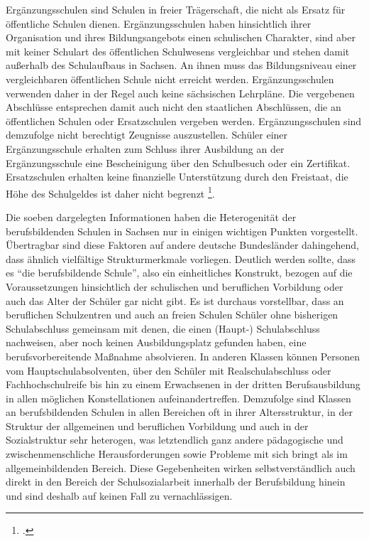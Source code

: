 Ergänzungsschulen sind Schulen in freier Trägerschaft, die nicht als Ersatz für öffentliche Schulen dienen. Ergänzungsschulen haben hinsichtlich ihrer Organisation und ihres Bildungsangebots einen schulischen Charakter, sind aber mit keiner Schulart des öffentlichen Schulwesens vergleichbar und stehen damit außerhalb des Schulaufbaus in Sachsen. An ihnen muss das Bildungsniveau einer vergleichbaren öffentlichen Schule nicht erreicht werden. Ergänzungsschulen verwenden daher in der Regel auch keine sächsischen Lehrpläne. Die vergebenen Abschlüsse entsprechen damit auch nicht den staatlichen Abschlüssen, die an öffentlichen Schulen oder Ersatzschulen vergeben werden. Ergänzungsschulen sind demzufolge nicht berechtigt Zeugnisse auszustellen. Schüler einer Ergänzungsschule erhalten zum Schluss ihrer Ausbildung an der Ergänzungsschule eine Bescheinigung über den Schulbesuch oder ein Zertifikat. Ersatzschulen erhalten keine finanzielle Unterstützung durch den Freistaat, die Höhe des Schulgeldes ist daher nicht begrenzt \footcite[vgl.]{SMKSK2015a}. 

Die soeben dargelegten Informationen haben die Heterogenität der berufsbildenden Schulen in Sachsen nur in einigen wichtigen Punkten vorgestellt. Übertragbar sind diese Faktoren auf andere deutsche Bundesländer dahingehend, dass ähnlich vielfältige Strukturmerkmale vorliegen. Deutlich werden sollte, dass es "`die berufsbildende Schule"', also ein einheitliches Konstrukt, bezogen auf die Voraussetzungen hinsichtlich der schulischen und beruflichen Vorbildung oder auch das Alter der Schüler gar nicht gibt. Es ist durchaus vorstellbar, dass an beruflichen Schulzentren und auch an freien Schulen Schüler ohne bisherigen Schulabschluss gemeinsam mit denen, die einen (Haupt-) Schulabschluss nachweisen, aber noch keinen Ausbildungsplatz gefunden haben, eine berufsvorbereitende Maßnahme absolvieren. In anderen Klassen können Personen vom Hauptschulabsolventen, über den Schüler mit Realschulabschluss oder Fachhochschulreife bis hin zu einem Erwachsenen in der dritten Berufsausbildung in allen möglichen Konstellationen aufeinandertreffen. Demzufolge sind Klassen an berufsbildenden Schulen in allen Bereichen oft in ihrer Altersstruktur, in der Struktur der allgemeinen und beruflichen Vorbildung und auch in der Sozialstruktur sehr heterogen, was letztendlich ganz andere pädagogische und zwischenmenschliche Herausforderungen sowie Probleme mit sich bringt als im allgemeinbildenden Bereich. Diese Gegebenheiten wirken selbstverständlich auch direkt in den Bereich der Schulsozialarbeit innerhalb der Berufsbildung hinein und sind deshalb auf keinen Fall zu vernachlässigen.

